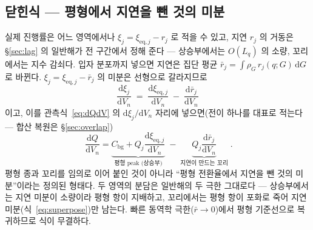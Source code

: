 \documentclass[11pt,a4paper]{article}
\newcommand{\dd}{\mathrm{d}}
\newcommand{\eq}{\mathrm{eq}}
\newcommand{\bg}{\mathrm{bg}}
\begin{document}
\subsection{닫힌식 — 평형에서 지연을 뺀 것의 미분}
실제 진행률은 어느 영역에서나 $\xi_j=\xi_{\eq,j}-r_j$ 로 적을 수 있고, 지연 $r_j$ 의 거동은
\S\ref{sec:lag} 의 일반해가 전 구간에서 정해 준다 — 상승부에서는 $O(L_q)$ 의 소량, 꼬리에서는 지수
감쇠다. 입자 분포까지 넣으면 지연은 집단 평균 $\bar r_j=\int\rho_G\,r_j(q;G)\,\dd G$ 로 바뀐다.
$\xi_j=\xi_{\eq,j}-\bar r_j$ 의 미분은 선형으로 갈라지므로
\begin{equation}
\frac{\dd\xi_j}{\dd V_n}\;=\;\frac{\dd\xi_{\eq,j}}{\dd V_n}\;-\;\frac{\dd\bar r_j}{\dd V_n}
\label{eq:xidecomp}
\end{equation}
이고, 이를 관측식~\eqref{eq:dQdV} 의 $\dd\xi_j/\dd V_n$ 자리에 넣으면(전이 하나를 대표로 적는다 —
합산 복원은 \S\ref{sec:overlap})
\begin{equation}
\boxed{\;\frac{\dd Q}{\dd V_n}
=\underbrace{C_\bg+Q_j\frac{\dd\xi_{\eq,j}}{\dd V_n}}_{\text{평형 peak (상승부)}}
\;-\;\underbrace{Q_j\frac{\dd\bar r_j}{\dd V_n}}_{\text{지연이 만드는 꼬리}}\;.}
\label{eq:closed}
\end{equation}
평형 종과 꼬리를 임의로 이어 붙인 것이 아니라 ``평형 전환율에서 지연을 뺀 것의 미분''이라는 정의된
형태다. 두 영역의 분담은 일반해의
두 극한 그대로다 — 상승부에서는 지연 미분이 소량이라 평형 항이 지배하고, 꼬리에서는 평형 항이 포화로 죽어
지연 미분(식~\eqref{eq:superpose})만 남는다. 빠른 동역학 극한($\bar r\to0$)에서 평형 기준선으로
복귀하므로 식이 무결하다.
\end{document}
